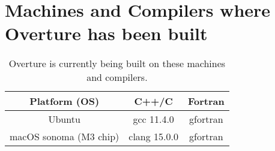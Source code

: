 
\section{Machines and Compilers where Overture has been built}

\begin{table}[hbt]
\begin{center}
\begin{tabular}{|c|c|c|}                   \hline
 Platform (OS)                   & C++/C         & Fortran \\ \hline
 Ubuntu                          & gcc 11.4.0    & gfortran \\
 macOS sonoma   (M3 chip)        & clang 15.0.0   & gfortran \\
 \hline
\end{tabular}
\caption{Overture is currently being built on these machines and compilers.}
\end{center}
\end{table}




